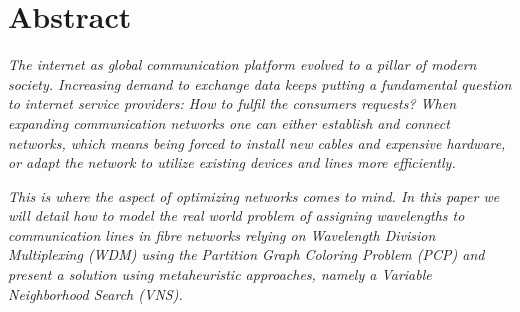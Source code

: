 \vspace*{\fill}
\section*{Abstract}
\textit{The internet as global communication platform evolved to a pillar of modern society. Increasing demand to exchange data keeps putting a fundamental question to internet service providers: How to fulfil the consumers requests? When expanding communication networks one can either establish and connect networks, which means being forced to install new cables and expensive hardware, or adapt the network to utilize existing devices and lines more efficiently.}

\textit{This is where the aspect of optimizing networks comes to mind. In this paper we will detail how to model the real world problem of assigning wavelengths to communication lines in fibre networks relying on Wavelength Division Multiplexing (WDM) using the Partition Graph Coloring Problem (PCP) and present a solution using metaheuristic approaches, namely a Variable Neighborhood Search (VNS).}
\vspace*{\fill}
